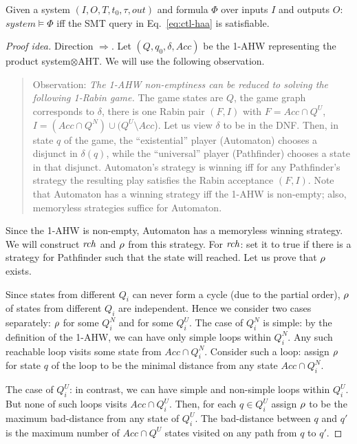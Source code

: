 \begin{theorem}
Given a system $(I,O,T,t_0,\tau,out)$ and \CTLstar formula $\Phi$ over inputs $I$ and outputs $O$:
$system \models \Phi$ iff the SMT query in Eq.~\ref{eq:ctl-haa} is satisfiable.
\end{theorem}
\begin{proof}[Proof idea]
Direction $\Rightarrow$.
Let $(Q, q_0, \delta, Acc)$ be the 1-AHW representing the product system$\otimes$AHT.
We will use the following observation.
\begin{quote}
Observation: %
{\em The 1-AHW non-emptiness can be reduced to solving the following 1-Rabin game.}
The game states are $Q$, the game graph corresponds to $\delta$,
there is one Rabin pair $(F,I)$ with
$F = Acc \cap Q^U$, $I = (Acc \cap Q^N) \cup (Q^U\!\setminus\! Acc$).
Let us view $\delta$ to be in the DNF.
Then, in state $q$ of the game,
the ``existential'' player (Automaton) chooses a disjunct in $\delta(q)$,
while the ``universal'' player (Pathfinder) chooses a state in that disjunct.
Automaton's strategy is winning iff for any Pathfinder's strategy the resulting play
satisfies the Rabin acceptance $(F,I)$.
Note that Automaton has a winning strategy iff the 1-AHW is non-empty;
also, memoryless strategies suffice for Automaton.
\end{quote}
Since the 1-AHW is non-empty, Automaton has a memoryless winning strategy.
We will construct $\mathit{rch}$ and $\rho$ from this strategy.
For $\mathit{rch}$:
set it to true if there is a strategy for Pathfinder such that the state will reached.
Let us prove that $\rho$ exists.

Since states from different $Q_i$ can never form a cycle
(due to the partial order),
$\rho$ of states from different $Q_i$ are independent.
Hence we consider two cases separately:
$\rho$ for some $Q^N_i$ and for some $Q^U_i$. 
\li
\-
The case of $Q^N_i$ is simple:
by the definition of the 1-AHW,
we can have only simple loops within $Q^N_i$.
Any such reachable loop visits some state from $Acc \cap Q_i^N$.
Consider such a loop:
assign $\rho$ for state $q$ of the loop to be
the minimal distance from any state $Acc \cap Q_i^N$.

\-
The case of $Q^U_i$:
in contrast, we can have simple and non-simple loops within $Q^U_i$.
But none of such loops visits $Acc \cap Q_i^U$.
Then, for each $q \in Q^U_i$ assign $\rho$
to be the maximum bad-distance from any state of $Q^U_i$.
The bad-distance between $q$ and $q'$ is
the maximum number of $Acc \cap Q^U$ states visited
on any path from $q$ to $q'$.
\il


\end{proof}
